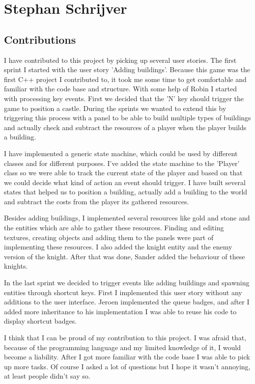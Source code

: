 \section{Stephan Schrijver}
\subsection{Contributions}
I have contributed to this project by picking up several user stories.
The first sprint I started with the user story 'Adding buildings'. Because this game was the first C++ project I contributed to, it took me some time to get comfortable and familiar with the code base and structure. With some help of Robin I started with processing key events. First we decided that the 'N' key should trigger the game to position a castle. During the sprints we wanted to extend this by triggering this process with a panel to be able to build multiple types of buildings and actually check and subtract the resources of a player when the player builds a building.

I have implemented a generic state machine, which could be used by different classes and for different purposes. I've added the state machine to the 'Player' class so we were able to track the current state of the player and based on that we could decide what kind of action an event should trigger. I have built several states that helped us to position a building, actually add a building to the world and subtract the costs from the player its gathered resources.

Besides adding buildings, I implemented several resources like gold and stone and the entities which are able to gather these resources. Finding and editing textures, creating objects and adding them to the panels were part of implementing these resources. I also added the knight entity and the enemy version of the knight. After that was done, Sander added the behaviour of these knights.

In the last sprint we decided to trigger events like adding buildings and spawning entities through shortcut keys. First I implemented this user story without any additions to the user interface. Jeroen implemented the queue badges, and after I added more inheritance to his implementation I was able to reuse his code to display shortcut badges.

I think that I can be proud of my contribution to this project. I was afraid that, because of the programming language and my limited knowledge of it, I would become a liability. After I got more familiar with the code base I was able to pick up more tasks. Of course I asked a lot of questions but I hope it wasn't annoying, at least people didn't say so.


